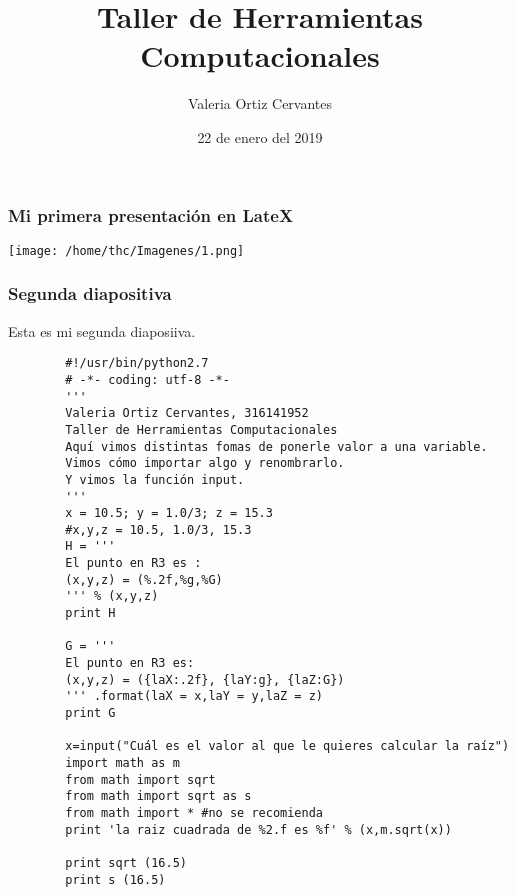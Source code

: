 \documentclass{beamer} %
\title{Taller de Herramientas Computacionales}
\author{Valeria Ortiz Cervantes}
\date{22 de enero del 2019}
\begin{document}
\maketitle
\begin{frame}
	\transdissolve
	\frametitle{Mi primera presentación en LateX}
		\begin{center}
			\texttt{[image: /home/thc/Imagenes/1.png]}
		\end{center}
\end{frame}

\begin{frame}
\transblindsvertical
	\frametitle{Segunda diapositiva}
	Esta es mi segunda diaposiiva.
\end{frame}

\begin{frame}[fragile] %
\transdissolve 
	\begin{verbatim}
		#!/usr/bin/python2.7
		# -*- coding: utf-8 -*-
		'''
		Valeria Ortiz Cervantes, 316141952
		Taller de Herramientas Computacionales
		Aquí vimos distintas fomas de ponerle valor a una variable.
		Vimos cómo importar algo y renombrarlo.
		Y vimos la función input.
		''' 
		x = 10.5; y = 1.0/3; z = 15.3
		#x,y,z = 10.5, 1.0/3, 15.3
		H = '''
		El punto en R3 es :
		(x,y,z) = (%.2f,%g,%G)
		''' % (x,y,z) 
		print H
		
		G = '''
		El punto en R3 es:
		(x,y,z) = ({laX:.2f}, {laY:g}, {laZ:G})
		''' .format(laX = x,laY = y,laZ = z)
		print G
		
		x=input("Cuál es el valor al que le quieres calcular la raíz")
		import math as m
		from math import sqrt
		from math import sqrt as s
		from math import * #no se recomienda
		print 'la raiz cuadrada de %2.f es %f' % (x,m.sqrt(x))
		
		print sqrt (16.5)
		print s (16.5)
	\end{verbatim}
\end{frame}
\end{document}
